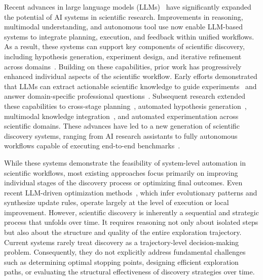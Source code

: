 Recent advances in large language models (LLMs)~\cite{openai2023gpt,bai2023qwen,guo2025deepseek} have significantly expanded the potential of AI systems in scientific research. Improvements in reasoning, multimodal understanding, and autonomous tool use now enable LLM-based systems to integrate planning, execution, and feedback within unified workflows. As a result, these systems can support key components of scientific discovery, including hypothesis generation, experiment design, and iterative refinement across domains~\cite{huang2022towards,ferrag2025llm}.
% 
Building on these capabilities, prior work has progressively enhanced individual aspects of the scientific workflow. Early efforts demonstrated that LLMs can extract actionable scientific knowledge to guide experiments~\cite{lin2023evolutionary,angelopoulos2024transforming} and answer domain-specific professional questions~\cite{alampara2025probing,polak2024extracting,dagdelen2024structured}. Subsequent research extended these capabilities to cross-stage planning~\cite{biomni}, automated hypothesis generation~\cite{wang2025discovery,aira,baek2025researchagent}, multimodal knowledge integration~\cite{steyaert2023multimodal,gao2025chemical}, and automated experimentation across scientific domains. These advances have led to a new generation of scientific discovery systems, ranging from AI research assistants to fully autonomous workflows capable of executing end-to-end benchmarks~\cite{king2004functional,mandal2025evaluating,ai_co_scientist}.

While these systems demonstrate the feasibility of system-level automation in scientific workflows, most existing approaches focus primarily on improving individual stages of the discovery process or optimizing final outcomes. Even recent LLM-driven optimization methods~\cite{liao2025llm4eo,jiang2025agenticsciml,kochnev2025optuna}, which infer evolutionary patterns and synthesize update rules, operate largely at the level of execution or local improvement.
% 
However, scientific discovery is inherently a sequential and strategic process that unfolds over time. It requires reasoning not only about isolated steps but also about the structure and quality of the entire exploration trajectory. Current systems rarely treat discovery as a trajectory-level decision-making problem. Consequently, they do not explicitly address fundamental challenges such as determining optimal stopping points, designing efficient exploration paths, or evaluating the structural effectiveness of discovery strategies over time.

